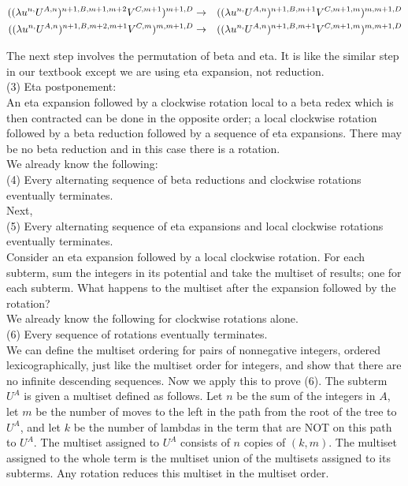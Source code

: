 \begin{eqnarray*}
 ((\lambda u^{n,} U^{A,n})^{n+1,B,m+1,m+2} V^{C,m+1})^{m+1,D} &\rightarrow& ((\lambda u^{n,} U^{A,n})^{n+1,B,m+1} V^{C,m+1,m})^{m,m+1,D}\\
 ((\lambda u^{n,} U^{A,n})^{n+1,B,m+2,m+1} V^{C,m})^{m,m+1,D} &\rightarrow& ((\lambda u^{n,} U^{A,n})^{n+1,B,m+1} V^{C,m+1,m})^{m,m+1,D}
\end{eqnarray*}

The next step involves the permutation of beta and eta. It is like the similar step in our textbook except we are using eta expansion, not reduction.\\

(3) Eta postponement:\\
An eta expansion followed by a clockwise rotation local to a beta redex which is then contracted can be done in the opposite order; a local clockwise rotation followed by a beta reduction followed by a sequence of eta expansions. There may be no beta reduction and in this case there is a rotation.\\

We already know the following:\\

(4) Every alternating sequence of beta reductions and clockwise rotations eventually terminates.\\

Next,\\

(5) Every alternating sequence of eta expansions and local clockwise rotations eventually terminates.\\

Consider an eta expansion followed by a local clockwise rotation. For each subterm, sum the integers in its potential and take the multiset of results; one for each subterm. What happens to the multiset after the expansion followed by the rotation?\\

We already know the following for clockwise rotations alone.\\

(6) Every sequence of rotations eventually terminates.\\

We can define the multiset ordering for pairs of nonnegative integers, ordered lexicographically, just like the multiset order for integers, and show that there are no infinite descending sequences. Now we apply this to prove (6). The subterm $U^{A}$ is given a multiset defined as follows. Let $n$ be the sum of the integers in $A$, let $m$ be the number of moves to the left in the path from the root of the tree to $U^{A}$, and let $k$ be the number of lambdas in the term that are NOT on this path to $U^{A}$. The multiset assigned to $U^{A}$ consists of $n$ copies of $(k,m)$. The multiset assigned to the whole term is the multiset union of the multisets assigned to its subterms. Any rotation reduces this multiset in the multiset order.\\

